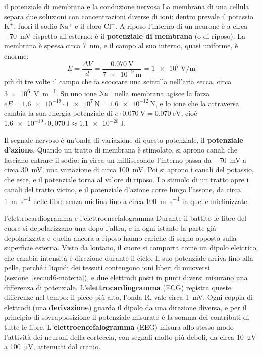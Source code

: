 \begin{applicazione}{il potenziale di membrana e la conduzione nervosa}
La membrana di una cellula separa due soluzioni con concentrazioni diverse di ioni: dentro prevale il potassio $\mathrm{K^{+}}$, fuori il sodio $\mathrm{Na^{+}}$ e il cloro $\mathrm{Cl^{-}}$. A riposo l'interno di un neurone è a circa \SI{-70}{\milli\volt} rispetto all'esterno: è il \textbf{potenziale di membrana} (o di riposo). La membrana è spessa circa \SI{7}{\nano\metre}, e il campo al suo interno, quasi uniforme, è enorme:
\[
  E = \frac{\Delta V}{d} = \frac{\SI{0,070}{\volt}}{\SI{7e-9}{\metre}} = \SI{1e7}{\volt\per\metre}
\]
più di tre volte il campo che fa scoccare una scintilla nell'aria secca, circa \SI{3e6}{\volt\per\metre}. Su uno ione $\mathrm{Na^{+}}$ nella membrana agisce la forza $eE = \num{1,6e-19} \cdot \num{1e7}\,\si{\newton} = \SI{1,6e-12}{\newton}$, e lo ione che la attraversa cambia la sua energia potenziale di $e \cdot \SI{0,070}{\volt} = \SI{0,070}{\electronvolt}$, cioè $\num{1,6e-19} \cdot 0{,}070\,\si{\joule} \approx \SI{1,1e-20}{\joule}$.

Il segnale nervoso è un'onda di variazione di questo potenziale, il \textbf{potenziale d'azione}. Quando un tratto di membrana è stimolato, si aprono canali che lasciano entrare il sodio: in circa un millisecondo l'interno passa da \SI{-70}{\milli\volt} a circa \SI{+30}{\milli\volt}, una variazione di circa \SI{100}{\milli\volt}. Poi si aprono i canali del potassio, che esce, e il potenziale torna al valore di riposo. Lo stimolo di un tratto apre i canali del tratto vicino, e il potenziale d'azione corre lungo l'assone, da circa \SI{1}{\metre\per\second} nelle fibre senza mielina fino a circa \SI{100}{\metre\per\second} in quelle mielinizzate.
\end{applicazione}



\begin{applicazione}{l'elettrocardiogramma e l'elettroencefalogramma}
Durante il battito le fibre del cuore si depolarizzano una dopo l'altra, e in ogni istante la parte già depolarizzata e quella ancora a riposo hanno cariche di segno opposto sulla superficie esterna. Visto da lontano, il cuore si comporta come un dipolo elettrico, che cambia intensità e direzione durante il ciclo. Il suo potenziale arriva fino alla pelle, perché i liquidi dei tessuti contengono ioni liberi di muoversi (sezione~\ref{sec:ud6-materia}), e due elettrodi posti in punti diversi misurano una differenza di potenziale. L'\textbf{elettrocardiogramma} (ECG) registra queste differenze nel tempo: il picco più alto, l'onda R, vale circa \SI{1}{\milli\volt}. Ogni coppia di elettrodi (una \textbf{derivazione}) guarda il dipolo da una direzione diversa, e per il principio di sovrapposizione il potenziale misurato è la somma dei contributi di tutte le fibre. L'\textbf{elettroencefalogramma} (EEG) misura allo stesso modo l'attività dei neuroni della corteccia, con segnali molto più deboli, da circa \SI{10}{\micro\volt} a \SI{100}{\micro\volt}, attenuati dal cranio.
\end{applicazione}

